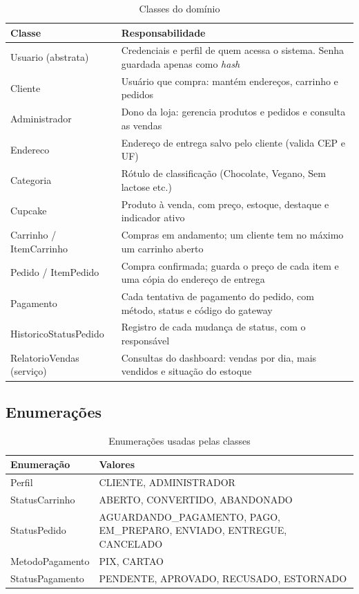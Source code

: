 \documentclass[12pt]{article}
\begin{document}
\begin{table}[H]
\centering\small\renewcommand{\arraystretch}{1.3}
\begin{tabular}{|p{3.4cm}|p{10.4cm}|}
\hline
\rowcolor{gray!30} \textbf{Classe} & \textbf{Responsabilidade} \\ \hline
Usuario (abstrata) & Credenciais e perfil de quem acessa o sistema. Senha guardada apenas como \textit{hash} \\ \hline
Cliente & Usuário que compra: mantém endereços, carrinho e pedidos \\ \hline
Administrador & Dono da loja: gerencia produtos e pedidos e consulta as vendas \\ \hline
Endereco & Endereço de entrega salvo pelo cliente (valida CEP e UF) \\ \hline
Categoria & Rótulo de classificação (Chocolate, Vegano, Sem lactose etc.) \\ \hline
Cupcake & Produto à venda, com preço, estoque, destaque e indicador ativo \\ \hline
Carrinho / ItemCarrinho & Compras em andamento; um cliente tem no máximo um carrinho aberto \\ \hline
Pedido / ItemPedido & Compra confirmada; guarda o preço de cada item e uma cópia do endereço de entrega \\ \hline
Pagamento & Cada tentativa de pagamento do pedido, com método, status e código do gateway \\ \hline
HistoricoStatusPedido & Registro de cada mudança de status, com o responsável \\ \hline
RelatorioVendas (serviço) & Consultas do dashboard: vendas por dia, mais vendidos e situação do estoque \\ \hline
\end{tabular}
\caption{Classes do domínio}
\end{table}

\subsection{Enumerações}

\begin{table}[H]
\centering\small\renewcommand{\arraystretch}{1.3}
\begin{tabular}{|l|p{9.6cm}|}
\hline
\rowcolor{gray!30} \textbf{Enumeração} & \textbf{Valores} \\ \hline
Perfil & CLIENTE, ADMINISTRADOR \\ \hline
StatusCarrinho & ABERTO, CONVERTIDO, ABANDONADO \\ \hline
StatusPedido & AGUARDANDO\_PAGAMENTO, PAGO, EM\_PREPARO, ENVIADO, ENTREGUE, CANCELADO \\ \hline
MetodoPagamento & PIX, CARTAO \\ \hline
StatusPagamento & PENDENTE, APROVADO, RECUSADO, ESTORNADO \\ \hline
\end{tabular}
\caption{Enumerações usadas pelas classes}
\end{table}
\end{document}
